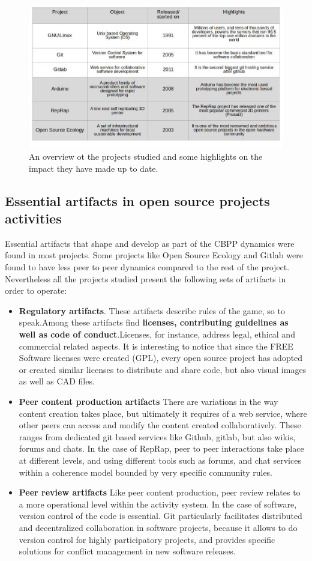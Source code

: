 \documentclass{ICED-Paper}%
\begin{document}
\begin{figure}
\includegraphics[width=\linewidth,height=\textheight,keepaspectratio]{Table.jpg}
\caption{\label{fig2}An overview ot the projects studied and some highlights on the impact they have made up to date.}
\end{figure}
\bigskip

\subsection{Essential artifacts in open source projects activities}
Essential artifacts that shape and develop as part of the CBPP dynamics were found in most projects. Some projects like Open Source Ecology and Gitlab were found to have less peer to peer dynamics compared to the rest of the project. Nevertheless all the projects studied present the following sets of artifacts in order to operate:
\bigskip
\begin{itemize}
\item \textbf{Regulatory artifacts}. These artifacts describe rules of the game, so to speak.Among these artifacts  find \textbf{licenses, contributing guidelines as well as code of conduct}.Licenses, for instance, address legal, ethical and commercial related aspects. It is interesting to notice that since the FREE Software licenses were created (GPL), every open source project has adopted or created similar licenses to distribute and share code, but also visual images as well as CAD files.
\item \textbf{Peer content production artifacts} There are variations in the way content creation takes place, but ultimately it requires of a web service, where other peers can access and modify the content created collaboratively. These ranges from dedicated git based services like Github, gitlab, but also wikis, forums and chats. In the case of RepRap, peer to peer interactions take place at different levels, and using different tools such as forums, and chat services within a coherence model bounded by very specific community rules.
\item \textbf{Peer review artifacts} Like peer content production, peer review relates to a more operational level within the activity system. In the case of software, version control of the code is essential. Git particularly facilitates distributed and decentralized collaboration in software projects, because it allows to do version control for highly participatory projects, and provides specific solutions for conflict management in new software releases.
\end{itemize}
\bigskip
\end{document}
